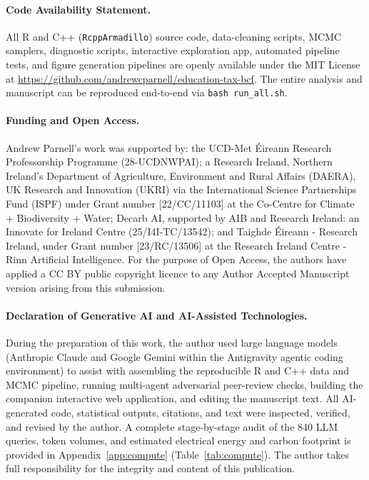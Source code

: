 \documentclass[11pt,a4paper]{article}
\begin{document}
\paragraph{Code Availability Statement.}
All R and C++ (\texttt{RcppArmadillo}) source code, data-cleaning scripts, MCMC samplers, diagnostic scripts, interactive exploration app, automated pipeline tests, and figure generation pipelines are openly available under the MIT License at \url{https://github.com/andrewcparnell/education-tax-bcf}. The entire analysis and manuscript can be reproduced end-to-end via \texttt{bash run\_all.sh}. %

\paragraph{Funding and Open Access.}
Andrew Parnell's work was supported by: the UCD-Met \'Eireann Research Professorship Programme (28-UCDNWPAI); a Research Ireland, Northern Ireland's Department of Agriculture, Environment and Rural Affairs (DAERA), UK Research and Innovation (UKRI) via the International Science Partnerships Fund (ISPF) under Grant number [22/CC/11103] at the Co-Centre for Climate + Biodiversity + Water; Decarb AI, supported by AIB and Research Ireland: an Innovate for Ireland Centre (25/I4I-TC/13542); and Taighde \'Eireann - Research Ireland, under Grant number [23/RC/13506] at the Research Ireland Centre - Rinn Artificial Intelligence. For the purpose of Open Access, the authors have applied a CC BY public copyright licence to any Author Accepted Manuscript version arising from this submission.

\paragraph{Declaration of Generative AI and AI-Assisted Technologies.}
During the preparation of this work, the author used large language models (Anthropic Claude and Google Gemini within the Antigravity agentic coding environment) to assist with assembling the reproducible R and C++ data and MCMC pipeline, running multi-agent adversarial peer-review checks, building the companion interactive web application, and editing the manuscript text. All AI-generated code, statistical outputs, citations, and text were inspected, verified, and revised by the author. A complete stage-by-stage audit of the 840 LLM queries, token volumes, and estimated electrical energy and carbon footprint is provided in Appendix~\ref{app:compute} (Table~\ref{tab:compute}). The author takes full responsibility for the integrity and content of this publication.
\end{document}
